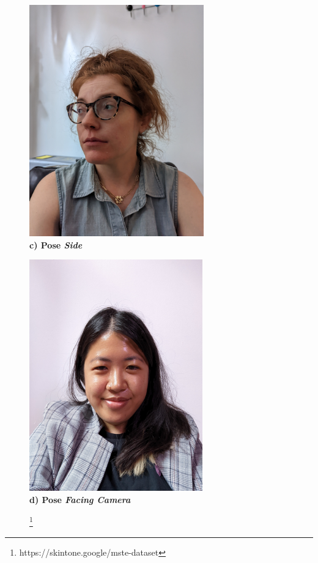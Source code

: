 \begin{figure}[h!]
    \begin{minipage}[!]{0.55\linewidth}
    \includegraphics[height=10cm]{Template_Latex_TCC-UNIFTEC/_lib/imagens/side.jpg}\\ \centering\textbf{ c) Pose \textit{Side}}
    \label{fig: side}
    \end{minipage}
    \begin{minipage}[!]{0.55\linewidth}
    \includegraphics[height=10cm]{Template_Latex_TCC-UNIFTEC/_lib/imagens/facing_camera.jpg}\\ \centering\textbf{ d) Pose\textit{ Facing Camera}}
    \label{fig: facing_camera}
    \end{minipage}
 \footnote{https://skintone.google/mste-dataset}
\end{figure}

